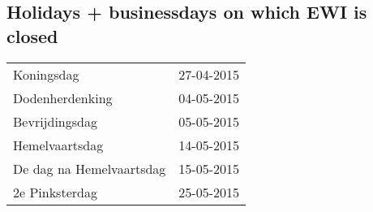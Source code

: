 \subsection{Holidays + businessdays on which EWI is closed}

\begin{tabular}{ll}
	Koningsdag               & 27-04-2015 \\
	Dodenherdenking          & 04-05-2015 \\
	Bevrijdingsdag           & 05-05-2015 \\
	Hemelvaartsdag           & 14-05-2015 \\
	De dag na Hemelvaartsdag & 15-05-2015 \\
	2e Pinksterdag           & 25-05-2015
\end{tabular}
